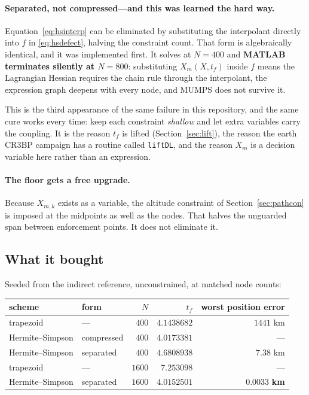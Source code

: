 \documentclass[11pt]{article}
\newcommand{\code}[1]{\texttt{#1}}
\begin{document}
\paragraph{Separated, not compressed---and this was learned the hard way.}
Equation~\eqref{eq:hsinterp} can be eliminated by substituting the interpolant
directly into $f$ in \eqref{eq:hsdefect}, halving the constraint count. That
form is algebraically identical, and it was implemented first. It solves at
$N = 400$ and \textbf{MATLAB terminates silently at $N = 800$}: substituting
$X_m(X, t_f)$ inside $f$ means the Lagrangian Hessian requires the chain rule
through the interpolant, the expression graph deepens with every node, and MUMPS
does not survive it.

This is the third appearance of the same failure in this repository, and the
same cure works every time: keep each constraint \emph{shallow} and let extra
variables carry the coupling. It is the reason $t_f$ is lifted
(Section~\ref{sec:lift}), the reason the earth CR3BP campaign has a routine
called \code{liftDL}, and the reason $X_m$ is a decision variable here rather
than an expression.

\paragraph{The floor gets a free upgrade.} Because $X_{m,k}$ exists as a
variable, the altitude constraint of Section~\ref{sec:pathcon} is imposed at the
midpoints as well as the nodes. That halves the unguarded span between
enforcement points. It does not eliminate it.

\subsection{What it bought}

Seeded from the indirect reference, unconstrained, at matched node counts:

\begin{table}[h]
\centering\small
\begin{tabular}{llrrr}
\toprule
scheme & form & $N$ & $t_f$ & worst position error \\
\midrule
trapezoid        & ---         & $400$  & $4.1438682$ & $1441$ km \\
Hermite--Simpson & compressed  & $400$  & $4.0173381$ & --- \\
Hermite--Simpson & separated   & $400$  & $4.6808938$ & $7.38$ km \\
\midrule
trapezoid        & ---         & $1600$ & $7.253098$  & --- \\
Hermite--Simpson & separated   & $1600$ & $\mathbf{4.0152501}$ & $\mathbf{0.0033}$ \textbf{km} \\
\bottomrule
\end{tabular}
\end{table}
\end{document}
